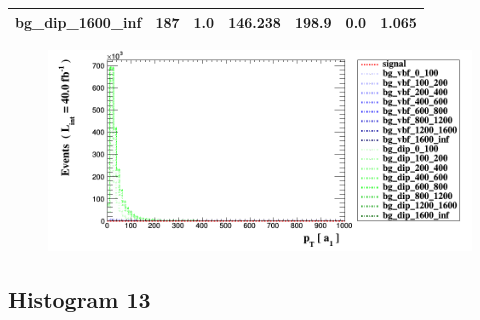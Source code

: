 \documentclass[a4paper, 10pt]{article}
\begin{document}
\begin{table}[H]
\begin{center}
\begin{tabular}{|m{23.0mm}|m{23.0mm}|m{18.0mm}|m{19.0mm}|m{19.0mm}|m{19.0mm}|m{19.0mm}|}
      \hline
      {\cellcolor{white}         bg\_dip\_1600\_inf}& {\cellcolor{white}         187}& {\cellcolor{white}         1.0}& {\cellcolor{white}         146.238}& {\cellcolor{white}         198.9}& {\cellcolor{green}         0.0}& {\cellcolor{green}         1.065}\\
\hline
    \end{tabular}
  \end{center}
\end{table}

\begin{figure}[H]
  \begin{center}
    \includegraphics[scale=0.45]{selection_11.png}\\
\caption{   }
  \end{center}
\end{figure}
      \newpage
\subsection{ Histogram 13}
\end{document}
